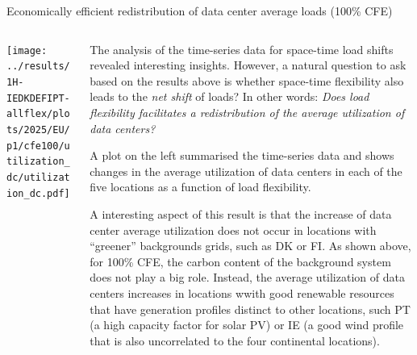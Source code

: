 \begin{frame}{{\normalsize Economically efficient redistribution of data center average loads (100\% CFE)}}
\label{ssec:redistribution}

  {\footnotesize
  
  \begin{columns}[T]
  \begin{column}{6cm}
    \centering
    \texttt{[image: ../results/1H-IEDKDEFIPT-allflex/plots/2025/EU/p1/cfe100/utilization\_dc/utilization\_dc.pdf]} 
  \end{column}

  \begin{column}{8.5cm}

  \vspace{0.3cm}
  The analysis of the time-series data for space-time load shifts revealed interesting insights. However, a natural question to ask based on the results above is whether space-time flexibility also leads to the \textit{net shift} of loads? In other words: \textit{Does load flexibility facilitates a redistribution of the average utilization of data centers?}
  
  \vspace{0.1cm}
  A plot on the left summarised the time-series data and shows changes in the \alert{average utilization} of data centers in each of the five locations as a function of load flexibility.

  \vspace{0.1cm}
  A interesting aspect of this result is that the increase of data center average utilization does not occur in locations with \enquote{greener} backgrounds grids, such as DK or FI. As shown above, for 100\% CFE, the carbon content of the background system does not play a big role. 
  Instead, the average utilization of data centers increases in locations wwith good renewable resources that have generation profiles distinct to other locations, such PT (a high capacity factor for solar PV) or IE (a good wind profile that is also uncorrelated to the four continental locations). 

  \end{column}
  \end{columns}
  }
\end{frame}



